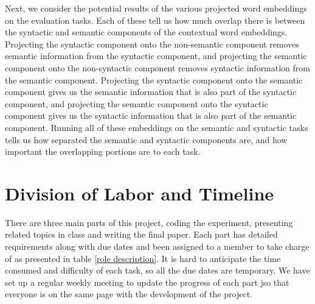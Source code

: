\documentclass[11pt,a4paper]{article}
\begin{document}
Next, we consider the potential results of the various projected word embeddings on the evaluation tasks. Each of these tell us how much overlap there is between the syntactic and semantic components of the contextual word embeddings. Projecting the syntactic component onto the non-semantic component removes semantic information from the syntactic component, and projecting the semantic component onto the non-syntactic component removes syntactic information from the semantic component. Projecting the syntactic component onto the semantic component gives us the semantic information that is also part of the syntactic component, and projecting the semantic component onto the syntactic component gives us the syntactic information that is also part of the semantic component. Running all of these embeddings on the semantic and syntactic tasks tells us how separated the semantic and syntactic components are, and how important the overlapping portions are to each task.




\section{Division of Labor and Timeline}
\label{sec:management}
There are three main parts of this project, coding the experiment, presenting related topics in class and writing the final paper. Each part has detailed requirements along with due dates and been assigned to a member to take charge of as presented in table \ref{role description}. It is hard to anticipate the time consumed and difficulty of each task, so all the due dates are temporary. We have set up a regular weekly meeting to update the progress of each part jso that everyone is on the same page with the development of the project. 
\end{document}
